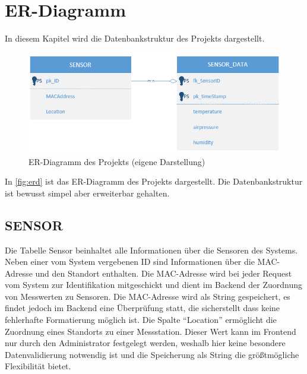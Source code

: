 \section{ER-Diagramm}
In diesem Kapitel wird die Datenbankstruktur des Projekts dargestellt.\\
\begin{figure}[h]
    \centering
    \includegraphics[width=1\linewidth]{img/erd}
    \caption[ER-Diagramm des Projekts]{ER-Diagramm des Projekts (eigene Darstellung)}
    \label{fig:erd}
\end{figure}

In \autoref{fig:erd} ist das ER-Diagramm des Projekts dargestellt. Die Datenbankstruktur ist bewusst simpel aber erweiterbar gehalten.
\subsection*{SENSOR}
Die Tabelle Sensor beinhaltet alle Informationen über die Sensoren des Systems.
Neben einer vom System vergebenen ID sind Informationen über die MAC-Adresse und den Standort enthalten.
Die MAC-Adresse wird bei jeder Request vom System zur Identifikation mitgeschickt und dient im Backend der Zuordnung von Messwerten zu Sensoren. Die MAC-Adresse wird als String gespeichert, es findet jedoch im Backend eine Überprüfung statt, die sicherstellt dass keine fehlerhafte Formatierung möglich ist.
Die Spalte \enquote{Location} ermöglicht die Zuordnung eines Standorts zu einer Messstation. Dieser Wert kann im Frontend nur durch den Administrator festgelegt werden, weshalb hier keine besondere Datenvalidierung notwendig ist und die Speicherung als String die größtmögliche Flexibilität bietet.
